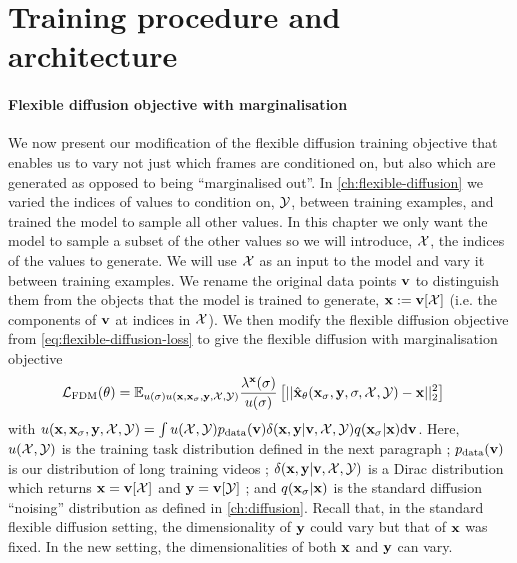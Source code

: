 \section{Training procedure and architecture}\label{sec:fdm-method}

\paragraph{Flexible diffusion objective with marginalisation}
We now present our modification of the flexible diffusion training objective that enables us to vary not just which frames are conditioned on, but also which are generated as opposed to being ``marginalised out''. In \cref{ch:flexible-diffusion} we varied the indices of values to condition on, ${\mathcal{Y}}$, between training examples, and trained the model to sample all other values. In this chapter we only want the model to sample a subset of the other values so we will introduce, ${\mathcal{X}}$, the indices of the values to generate. We will use ${\mathcal{X}}$ as an input to the model and vary it between training examples. We rename the original data points ${\mathbf{v}}$ to distinguish them from the objects that the model is trained to generate, ${\mathbf{x}} := {\mathbf{v}}[{\mathcal{X}}]$ (i.e. the components of ${\mathbf{v}}$ at indices in ${\mathcal{X}}$). We then modify the flexible diffusion objective from \cref{eq:flexible-diffusion-loss} to give the flexible diffusion with marginalisation objective
\begin{align} \label{eq:fdm-loss}
    \mathcal{L}_\text{FDM}(\theta) &= 
    \mathbb{E}_{u(\sigma) u({\mathbf{x}}, {\mathbf{x}}_\sigma, {\mathbf{y}}, {\mathcal{X}}, {\mathcal{Y}})} \frac{\lambda^{\mathbf{x}}(\sigma)}{u(\sigma)} \left[ 
    || \hat{{\mathbf{x}}}_\theta({\mathbf{x}}_\sigma, {\mathbf{y}}, \sigma, {\mathcal{X}}, {\mathcal{Y}}) - {\mathbf{x}} ||_2^2 \right]
\end{align}
with $u({\mathbf{x}}, {\mathbf{x}}_\sigma, {\mathbf{y}}, {\mathcal{X}}, {\mathcal{Y}}) = \int u({\mathcal{X}}, {\mathcal{Y}})p_{\rm{data}}({\mathbf{v}})\delta({\mathbf{x}},{\mathbf{y}}|{\mathbf{v}},{\mathcal{X}},{\mathcal{Y}})q({\mathbf{x}}_\sigma|{\mathbf{x}}) \mathrm{d}{\mathbf{v}}$. Here, $u({\mathcal{X}}, {\mathcal{Y}})$ is the training task distribution defined in the next paragraph ; $p_{\rm{data}}({\mathbf{v}})$ is our distribution of long training videos ; $\delta({\mathbf{x}},{\mathbf{y}}|{\mathbf{v}},{\mathcal{X}},{\mathcal{Y}})$ is a Dirac distribution which returns ${\mathbf{x}} = {\mathbf{v}}[{\mathcal{X}}]$ and ${\mathbf{y}} = {\mathbf{v}}[{\mathcal{Y}}]$ ; and $q({\mathbf{x}}_\sigma | {\mathbf{x}})$ is the standard diffusion ``noising'' distribution as defined in \cref{ch:diffusion}. Recall that, in the standard flexible diffusion setting, the dimensionality of ${\mathbf{y}}$ could vary but that of ${\mathbf{x}}$ was fixed. In the new setting, the dimensionalities of both ${\mathbf{x}}$ and ${\mathbf{y}}$ can vary.

